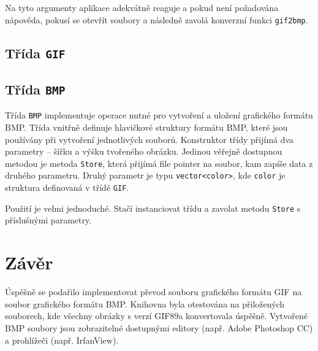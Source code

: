 \documentclass[11pt,a4paper]{article}
\begin{document}
Na tyto argumenty aplikace adekvátně reaguje a pokud není požadována nápověda, pokusí se otevřít soubory a následně zavolá konverzní funkci \texttt{gif2bmp}.

\subsection{Třída \texttt{GIF}}

\subsection{Třída \texttt{BMP}}

Třída \texttt{BMP} implementuje operace nutné pro vytvoření a uložení grafického formátu BMP. Třída vnitřně definuje hlavičkové struktury formátu BMP, které jsou používány při vytvoření jednotlivých souborů. Konstruktor třídy přijímá dva parametry -- šířku a výšku tvořeného obrázku. Jedinou věřejně dostupnou metodou je metoda \texttt{Store}, která přijímá file pointer na soubor, kam zapíše data z druhého parametru. Druhý parametr je typu \texttt{vector<color>}, kde \texttt{color} je struktura definovaná v třídě \texttt{GIF}.

Použití je velmi jednoduché. Stačí instanciovat třídu a zavolat metodu \texttt{Store} s příslušnými parametry.


\section{Závěr}

Úspěšně se podařilo implementovat převod souboru grafického formátu GIF na soubor grafického formátu BMP. Knihovna byla otestována na přiložených souborech, kde všechny obrázky s verzí GIF89a konvertovala úspěšně. Vytvořené BMP soubory jsou zobrazitelné dostupnými editory (např. Adobe Photoshop CC) a prohlížeči (např. IrfanView).
\end{document}
